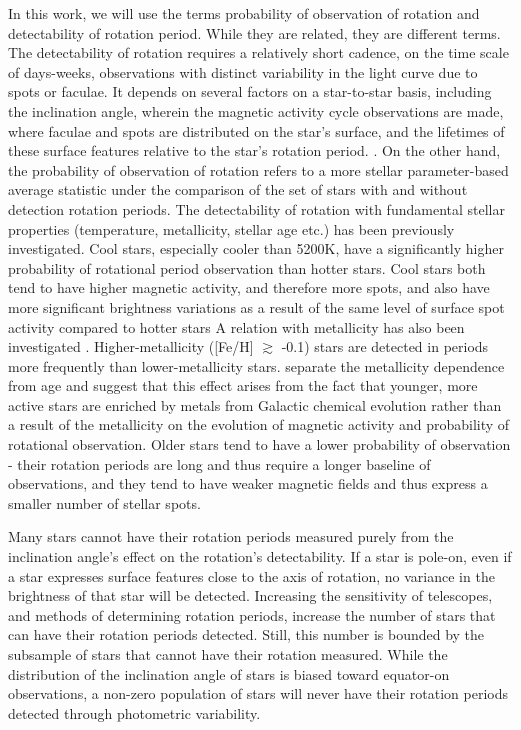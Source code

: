 In this work, we will use the terms probability of observation of rotation and detectability of rotation period.
While they are related, they are different terms.
The detectability of rotation requires a relatively short cadence, on the time scale of days-weeks, observations with distinct variability in the light curve due to spots or faculae.
It depends on several factors on a star-to-star basis, including the inclination angle, wherein the magnetic activity cycle observations are made, where faculae and spots are distributed on the star's surface, and the lifetimes of these surface features relative to the star's rotation period. \citep{aigrain_hare_2015, reinhold_transition_2019, reinhold_where_2021}.
On the other hand, the probability of observation of rotation refers to a more stellar parameter-based average statistic under the comparison of the set of stars with and without detection rotation periods.
The detectability of rotation with fundamental stellar properties (temperature, metallicity, stellar age etc.) has been previously investigated.
Cool stars, especially cooler than 5200K, have a significantly higher probability of rotational period observation than hotter stars.
Cool stars both tend to have higher magnetic activity, and therefore more spots, and also have more significant brightness variations as a result of the same level of surface spot activity compared to hotter stars \citep{ mcquillan_rotation_2014, santos_surface_2021, zhang_magnetic_2020}
A relation with metallicity has also been investigated \citep{amard_evidence_2020,see_photometric_2021,claytor_recovery_2022}.
Higher-metallicity ([Fe/H] $\gtrsim$ -0.1) stars are detected in periods more frequently than lower-metallicity stars.
 \citep{avallone_rotation_2022, masuda_detectability_2022} separate the metallicity dependence from age and suggest that this effect arises from the fact that younger, more active stars are enriched by metals from Galactic chemical evolution rather than a result of the metallicity on the evolution of magnetic activity and probability of rotational observation.
Older stars tend to have a lower probability of observation - their rotation periods are long and thus require a longer baseline of observations, and they tend to have weaker magnetic fields and thus express a smaller number of stellar spots.

Many stars cannot have their rotation periods measured purely from the inclination angle's effect on the rotation's detectability.
If a star is pole-on, even if a star expresses surface features close to the axis of rotation, no variance in the brightness of that star will be detected.
Increasing the sensitivity of telescopes, and methods of determining rotation periods, increase the number of stars that can have their rotation periods detected.
 Still, this number is bounded by the subsample of stars that cannot have their rotation measured.
While the distribution of the inclination angle of stars is biased toward equator-on observations, a non-zero population of stars will never have their rotation periods detected through photometric variability.

